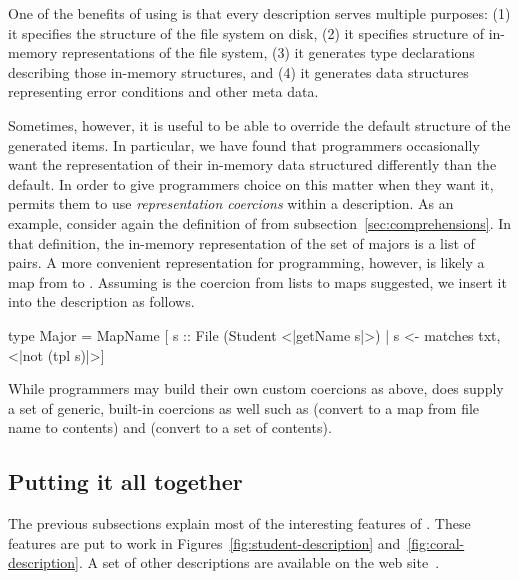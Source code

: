 \documentclass[nocopyrightspace,natbib]{sigplanconf}
\begin{document}
One of the benefits of using \forest{} is that every description serves multiple purposes:
(1) it specifies the structure of the file system on disk, (2) it specifies structure of in-memory
representations of the file system, (3) it generates type declarations describing those in-memory
structures, and (4) it generates data structures representing error conditions and other meta data.

Sometimes, however, it is useful to be able to override the default structure of the generated items.
In particular, we have found that programmers occasionally want the representation of their in-memory data
structured differently than the default.  In order to give programmers choice on this matter when they want it,
\forest{} permits them to use {\em representation coercions} within a description.  As an example, consider
again the definition of  from subsection~\ref{sec:comprehensions}.  In that definition, the
in-memory representation of the set of majors is a list of  pairs.  A more convenient
representation for programming, however, is likely a map from  to .  Assuming
 is the coercion from lists to maps suggested, 
we insert it into the description as follows.
\begin{code}
type Major = 
  MapName [ s :: File (Student <|getName s|>) 
          | s <- matches txt, <|not (tpl s)|>]
\end{code}
While programmers may build their own custom coercions as above, \forest{} does supply a set of 
generic, built-in coercions as well such as  (convert to a map from file name to contents)
and  (convert to a set of contents).

\subsection{Putting it all together}

The previous subsections explain most of the interesting features of \forest{}.
These features are put to work in Figures~\ref{fig:student-description}
and~\ref{fig:coral-description}.  A set of other descriptions are available on 
the \forest{} web site~\cite{forest-web-site}.
\end{document}
